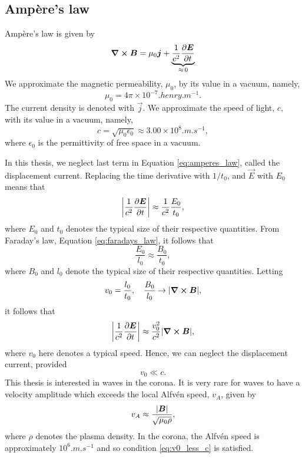\subsection{Amp\`ere's law}
\label{sec:amperes_law}

Amp\`ere's law is given by
\begin{equation}
    \label{eq:amperes_law}
    \curl{\boldsymbol{B}}=\mu_0\boldsymbol{j}+\underbrace{\frac{1}{c^2}\pdv{\boldsymbol{E}}{t}}_{\approx\,0}
\end{equation}
We approximate the magnetic permeability, $\mu_0$, by its value in a vacuum, namely,
\[\mu_0=4\pi\times10^{-7}\si{.henry.m^{-1}}.\]
The current density is denoted with $\vec{j}$. We approximate the speed of light, $c$, with its value in a vacuum, namely,
\[c=\sqrt{\mu_0\epsilon_0}\approx3.00\times10^8\si{.m.s^{-1}},\]
where $\epsilon_0$ is the permittivity of free space in a vacuum. 

In this thesis, we neglect last term in Equation \eqref{eq:amperes_law}, called the displacement current. Replacing the time derivative with $1/t_0$, and $\vec{E}$ with $E_0$ means that
\[\abs{\frac{1}{c^2}\pdv{\boldsymbol{E}}{t}}\approx\frac{1}{c^2}\frac{E_0}{t_0},\]
where $E_0$ and $t_0$ denotes the typical size of their respective quantities. From Faraday's law, Equation \eqref{eq:faradays_law}, it follows that
\[\frac{E_0}{l_0}\approx \frac{B_0}{t_0},\]
where $B_0$ and $l_0$ denote the typical size of their respective quantities. Letting
\[v_0=\frac{l_0}{t_0},\quad \frac{B_0}{l_0}\rightarrow|\curl\boldsymbol{B}|,\]
it follows that
\[\abs{\frac{1}{c^2}\pdv{\boldsymbol{E}}{t}}\approx\frac{v_0^2}{c^2}\abs{\curl{\boldsymbol{B}}},\]
where $v_0$ here denotes a typical speed. Hence, we can neglect the displacement current, provided
\begin{equation}
    \label{eq:v0_less_c}
    v_0\ll c.
\end{equation}
This thesis is interested in waves in the corona. It is very rare for waves to have a velocity amplitude which exceeds the local Alfv\'en speed, $v_A$, given by
\begin{equation}
    v_A\approx\frac{\abs{\boldsymbol{B}}}{\sqrt{{\mu}_0\rho}},
\end{equation}
where $\rho$ denotes the plasma density. In the corona, the Alfv\'en speed is approximately $10^6\si{.m.s^{-1}}$ and so condition \eqref{eq:v0_less_c} is satisfied.


